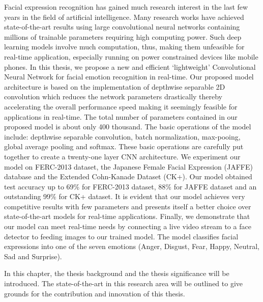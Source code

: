 \documentclass[master]{thesis-uestc}
\begin{document}
\begin{englishabstract}
Facial expression recognition has gained much research interest in the last few years in the field of artificial intelligence. Many research works have achieved state-of-the-art results using large convolutional neural networks containing millions of trainable parameters requiring high computing power. Such deep learning models involve much computation, thus, making them unfeasible for real-time application, especially running on power constrained devices like mobile phones. In this thesis, we propose a new and efficient `lightweight' Convolutional Neural Network for facial emotion recognition in real-time. Our proposed model architecture is based on the implementation of depthwise separable 2D convolution which reduces the network parameters drastically thereby accelerating the overall performance speed making it seemingly feasible for applications in real-time. The total number of parameters contained in our proposed model is about only 400 thousand. The basic operations of the model include: depthwise separable convolution, batch normalization, max-pooing, global average pooling and softmax. These basic operations are carefully put together to create a twenty-one layer CNN architecture. We experiment our model on FERC-2013 dataset, the Japanese Female Facial Expression (JAFFE) database and the Extended Cohn-Kanade Dataset (CK+). Our model obtained test accuracy up to 69\% for FERC-2013 dataset, 88\% for JAFFE dataset and an outstanding 99\% for CK+ dataset. It is evident that our model achieves very competitive results with few parameters and presents itself a better choice over state-of-the-art models for real-time applications. Finally, we demonstrate that our model can meet real-time needs by connecting a live video stream to a face detector to feeding images to our trained model. The model classifies facial expressions into one of the seven emotions (Anger, Disgust, Fear, Happy, Neutral, Sad and Surprise).

\end{englishabstract}

\thesistableofcontents
\thesisfigurelist
\thesistablelist


\thesischapterexordium

In this chapter, the thesis background and the thesis significance will be introduced. The state-of-the-art in this research area will be outlined to give grounds for the contribution and innovation of this thesis. 
\end{document}

